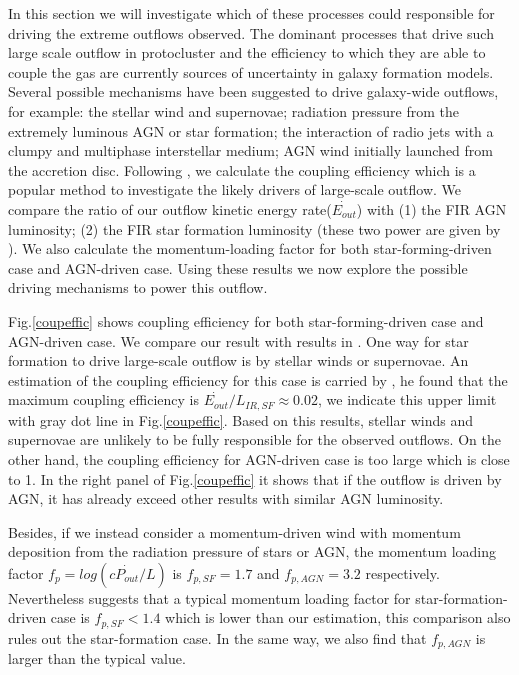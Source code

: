 \documentclass{subfiles}
\begin{document}
	In this section we will investigate which of these processes could responsible for driving the extreme outflows observed. The dominant processes that drive such large scale outflow in protocluster and the efficiency to which they are able to couple the gas are currently sources of uncertainty in galaxy formation models. Several possible mechanisms have been suggested to drive galaxy-wide outflows, for example: the stellar wind and supernovae; radiation pressure from the extremely luminous AGN or star formation; the interaction of radio jets with a clumpy and multiphase interstellar medium; AGN wind initially launched from the accretion disc. Following \cite{harrison2014kiloparsec}, we calculate the coupling efficiency which is a popular method to investigate the likely drivers of large-scale outflow. We compare the ratio of our outflow kinetic energy rate($\dot{E_{out}}$) with (1) the FIR AGN luminosity; (2) the FIR star formation luminosity (these two power are given by \cite{arrigoni2018qso}). We also calculate the momentum-loading factor for both star-forming-driven case and AGN-driven case. Using these results we now explore the possible driving mechanisms to power this outflow. 
	 
	 Fig.\ref{coupeffic} shows coupling efficiency for both star-forming-driven case and AGN-driven case. We compare our result with results in \cite{harrison2014kiloparsec}. One way for star formation to drive large-scale outflow is by stellar winds or supernovae. An estimation of the coupling efficiency for this case is carried by \cite{kennicutt1998star}, he found that the maximum coupling efficiency is $\dot{E_{out}}/L_{IR,SF} \approx 0.02$, we indicate this upper limit with gray dot line in Fig.\ref{coupeffic}. Based on this results, stellar winds and supernovae are unlikely to be fully responsible for the observed outflows. On the other hand, the coupling efficiency for AGN-driven case is too large which is close to 1. In the right panel of Fig.\ref{coupeffic} it shows that if the outflow is driven by AGN, it has already exceed other results with similar AGN luminosity. 
	 
	 Besides, if we instead consider a momentum-driven wind with momentum deposition from the radiation pressure of stars or AGN, the momentum loading factor $f_{p}=log(c\dot{P_{out}}/L)$ is $f_{p,SF}=1.7$ and $f_{p,AGN}=3.2$ respectively. Nevertheless \cite{zubovas2018agn} suggests that a typical momentum loading factor for star-formation-driven case is $f_{p,SF}< 1.4$ which is lower than our estimation, this comparison also rules out the star-formation case. In the same way, we also find that $f_{p,AGN}$ is larger than the typical value. 
	 
\end{document}
